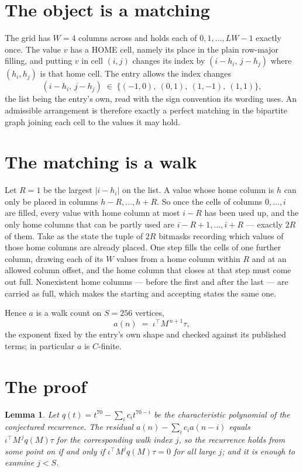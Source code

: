 \documentclass[11pt,a4paper]{article}
\theoremstyle{plain}
\newtheorem{lemma}[theorem]{Lemma}
\theoremstyle{definition}
\begin{document}
\section{The object is a matching}

The grid has $W=4$ columns across and holds each of $0,1,\dots,LW-1$ exactly once. The value
$v$ has a HOME cell, namely its place in the plain row-major filling, and putting $v$ in cell
$(i,j)$ changes its index by $(i-h_i,\,j-h_j)$ where $(h_i,h_j)$ is that home cell. The entry
allows the index changes
\[
(i-h_i,\,j-h_j)\;\in\;\{(-1,0),\ (0,1),\ (1,-1),\ (1,1)\},
\]
the list being the entry's own, read with the sign convention its wording uses. An admissible
arrangement is therefore exactly a perfect matching in the bipartite graph joining each cell to
the values it may hold.

\section{The matching is a walk}

Let $R=1$ be the largest $|i-h_i|$ on the list. A value whose home column is $h$ can only be
placed in columns $h-R,\dots,h+R$. So once the cells of columns $0,\dots,i$ are filled, every
value with home column at most $i-R$ has been used up, and the only home columns that can be
partly used are $i-R+1,\dots,i+R$ --- exactly $2R$ of them. Take as the state the tuple of
$2R$ bitmasks recording which values of those home columns are already placed. One step fills
the cells of one further column, drawing each of its $W$ values from a home column within $R$
and at an allowed column offset, and the home column that closes at that step must come out
full. Nonexistent home columns --- before the first and after the last --- are carried as
full, which makes the starting and accepting states the same one.

Hence $a$ is a walk count on $S=256$ vertices,
\[
a(n)\;=\;\iota^{\!\top}M^{\,n+1}\tau ,
\]
the exponent fixed by the entry's own shape and checked against its published terms; in
particular $a$ is $C$-finite.

\section{The proof}

\begin{lemma}\label{lem:crit}
Let $q(t)=t^{70}-\sum_i c_it^{70-i}$ be the characteristic polynomial of the
conjectured recurrence. The residual $a(n)-\sum_ic_ia(n-i)$ equals
$\iota^{\!\top}M^{\,j}q(M)\tau$ for the corresponding walk index $j$, so the recurrence
holds from some point on if and only if $\iota^{\!\top}M^{j}q(M)\tau=0$ for all large $j$;
and it is enough to examine $j<S$.
\end{lemma}
\end{document}
